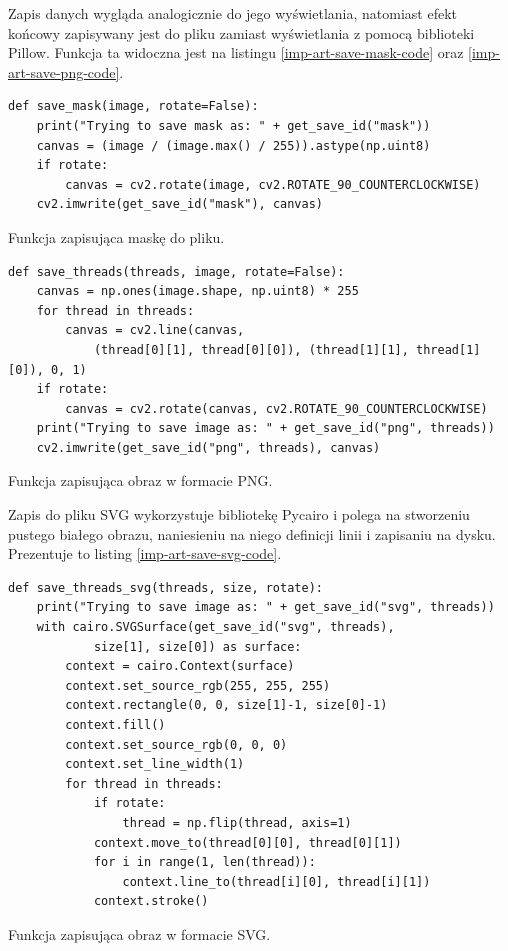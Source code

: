        Zapis danych wygląda analogicznie do jego wyświetlania, natomiast efekt końcowy zapisywany jest do pliku zamiast wyświetlania z pomocą biblioteki Pillow. Funkcja ta widoczna jest na listingu \ref{imp-art-save-mask-code} oraz \ref{imp-art-save-png-code}.
        \begin{code}[H]
        \begin{verbatim}
def save_mask(image, rotate=False):
    print("Trying to save mask as: " + get_save_id("mask"))
    canvas = (image / (image.max() / 255)).astype(np.uint8)
    if rotate:
        canvas = cv2.rotate(image, cv2.ROTATE_90_COUNTERCLOCKWISE)
    cv2.imwrite(get_save_id("mask"), canvas)
        \end{verbatim}
        \caption{Funkcja zapisująca maskę do pliku.}
        \label{imp-art-save-mask-code}
        \end{code}
        
        \begin{code}[H]
        \begin{verbatim}
def save_threads(threads, image, rotate=False):
    canvas = np.ones(image.shape, np.uint8) * 255
    for thread in threads:
        canvas = cv2.line(canvas, 
            (thread[0][1], thread[0][0]), (thread[1][1], thread[1][0]), 0, 1)
    if rotate:
        canvas = cv2.rotate(canvas, cv2.ROTATE_90_COUNTERCLOCKWISE)
    print("Trying to save image as: " + get_save_id("png", threads))
    cv2.imwrite(get_save_id("png", threads), canvas)
        \end{verbatim}
        \caption{Funkcja zapisująca obraz w formacie PNG.}
        \label{imp-art-save-png-code}
        \end{code}

        Zapis do pliku SVG wykorzystuje bibliotekę Pycairo i polega na stworzeniu pustego białego obrazu, naniesieniu na niego definicji linii i zapisaniu na dysku. Prezentuje to listing \ref{imp-art-save-svg-code}.
        \begin{code}[H]
        \begin{verbatim}
def save_threads_svg(threads, size, rotate):
    print("Trying to save image as: " + get_save_id("svg", threads))
    with cairo.SVGSurface(get_save_id("svg", threads), 
            size[1], size[0]) as surface:
        context = cairo.Context(surface)
        context.set_source_rgb(255, 255, 255)
        context.rectangle(0, 0, size[1]-1, size[0]-1)
        context.fill()
        context.set_source_rgb(0, 0, 0)
        context.set_line_width(1)
        for thread in threads:
            if rotate:
                thread = np.flip(thread, axis=1)
            context.move_to(thread[0][0], thread[0][1])
            for i in range(1, len(thread)):
                context.line_to(thread[i][0], thread[i][1])
            context.stroke()
        \end{verbatim}
        \caption{Funkcja zapisująca obraz w formacie SVG.}
        \label{imp-art-save-svg-code}
        \end{code}

